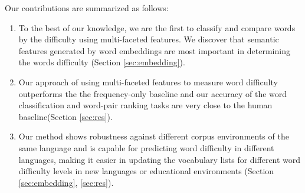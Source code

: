 
Our contributions are summarized as follows:
\begin{enumerate}
	\item To the best of our knowledge, we are the first to classify and compare words by the difficulty using multi-faceted features.
	We discover that semantic features generated by word embeddings are most important in determining the words difficulty (Section \ref{sec:embedding}).
	\item Our approach of using multi-faceted features to measure word difficulty outperforms the the frequency-only baseline and our accuracy of the word classification and word-pair ranking tasks are very close to the human baseline(Section \ref{sec:res}).
	\item Our method shows robustness against different corpus environments of the same language and is capable for predicting word difficulty in different languages, making it easier in updating the vocabulary lists for different word difficulty levels in new languages or 
	educational environments (Section \ref{sec:embedding}, \ref{sec:res}).
\end{enumerate}

